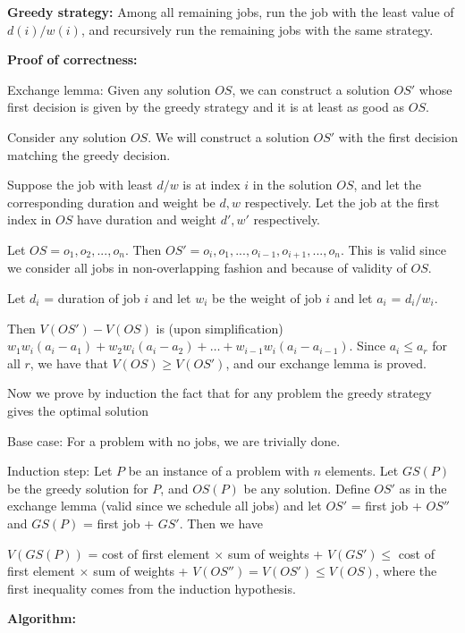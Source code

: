 \documentclass[answers]{exam}
\newenvironment{answer}{%
     \renewcommand{\solutiontitle}{\noindent\textbf{Answer:}\enspace}
     \begin{solution}
     }{%
     \end{solution}
     \renewcommand{\solutiontitle}{\noindent\textbf{Solution:}\enspace}
 }
\begin{document}
\begin{questions}
\begin{parts}
    \begin{answer}

        \textbf{Greedy strategy:}
        Among all remaining jobs, run the job with the least value of $d(i)/w(i)$, and recursively run the remaining jobs with the same strategy.

        \textbf{Proof of correctness:}

        Exchange lemma: Given any solution $OS$, we can construct a solution $OS'$ whose first decision is given by the greedy strategy and it is at least as good as $OS$.

Consider any solution $OS$. We will construct a solution $OS'$ with the first decision matching the greedy decision.

Suppose the job with least $d/w$ is at index $i$ in the solution $OS$, and let the corresponding duration and weight be $d, w$ respectively. Let the job at the first index in $OS$ have duration and
        weight $d', w'$ respectively.

        Let $OS = o_1, o_2, ..., o_n$. Then $OS' = o_i, o_1, ..., o_{i - 1}, o_{i + 1}, ..., o_n$. This is valid since we consider all jobs in non-overlapping fashion and because of validity of $OS$.

Let $d_i$ = duration of job $i$ and let $w_i$ be the weight of job $i$ and let $a_i$ = $d_i/w_i$.

        Then $V(OS') - V(OS)$ is (upon simplification) $w_1 w_i (a_i - a_1) + w_2 w_i (a_i - a_2) + \ldots + w_{i - 1} w_i (a_i - a_{i - 1})$. Since $a_i \le a_r$ for all $r$, we have that $V(OS) \ge
        V(OS')$, and our exchange lemma is proved.

Now we prove by induction the fact that for any problem the greedy strategy gives the optimal solution

Base case: For a problem with no jobs, we are trivially done.

Induction step: Let $P$ be an instance of a problem with $n$ elements.
Let $GS(P)$ be the greedy solution for $P$, and $OS(P)$ be any solution. Define $OS'$ as in the exchange lemma (valid since we schedule all jobs) and let $OS'$ = first job + $OS''$ and $GS(P)$ = first
        job + $GS'$. Then we have

$V(GS(P))$ = cost of first element $\times$ sum of weights + $V(GS') \le$ cost of first element $\times$ sum of weights + $V(OS'') = V(OS') \le V(OS)$,
where the first inequality comes from the induction hypothesis.

        \textbf{Algorithm:}


\end{answer}
\end{parts}
\end{questions}
\end{document}
